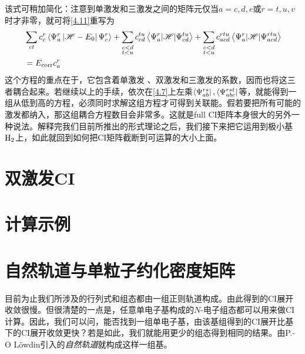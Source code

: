 该式可稍加简化：注意到单激发和三激发之间的矩阵元仅当$a=c,d,e$或$r=t,u,v$时才非零，就可将\eqref{4.11}重写为
\begin{align}
&\sum_{c t} c_{c}^{r}\left\langle\Psi_{a}^{r}\left|\mathscr{H}-E_{0}\right| \Psi_{c}^{r}\right\rangle+\sum_{\substack{c<d \\ t<u}} c_{cd}^{tu}\left\langle\Psi_{a}^{r}|\mathscr{H}| \Psi_{c d}^{tu}\right\rangle+\sum_{\substack{c<d\\ t<u}} c_{acd}^{rtu}\left\langle\Psi_{a}^{r}|\mathscr{H}| \Psi_{acd}^{rtu}\right\rangle \notag \\
&=E_{\mathrm{corr}} c_{a}^{r}
\label{4.12}
\end{align}
这个方程的重点在于，它包含着单激发
、双激发和三激发的系数，因而也将这三者耦合起来。若继续以上的手续，依次在\eqref{4.7}上左乘$\Bra{\Psi_{ab}^{rs}},\Bra{\Psi_{abc}^{rst}}$等，就能得到一组从低到高的方程，必须同时求解这组方程才可得到关联能。假若要把所有可能的激发都纳入，那这组耦合方程数目会非常多。这就是full CI矩阵本身很大的另外一种说法。解释完我们目前所推出的形式理论之后，我们接下来把它运用到极小基$\mathrm{H}_2$上，如此就回到如何把CI矩阵截断到可运算的大小上面。





















\section{双激发CI}\mbox{}
\label{sec4.3}
\section{计算示例}\mbox{}
\label{sec4.4}
\section{自然轨道与单粒子约化密度矩阵}
\label{sec4.4}
目前为止我们所涉及的行列式和组态都由一组正则\hft 轨道构成。由此得到的CI展开收敛很慢。但很清楚的一点是，任意单电子基构成的$N$-电子组态都可以用来做CI计算。因此，我们可以问，能否找到一组单电子基，由该基组得到的CI展开比\hft 基下的CI展开收敛更快？若是如此，我们就能用更少的组态得到相同的结果。由P.-O L\"owdin引入的\emph{自然轨道}就构成这样一组基。

